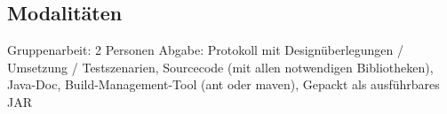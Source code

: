 \documentclass[letterpaper, 12pt]{article}
\let\tempsubsection\subsection
\renewcommand\subsection[1]{\vspace{0cm}\tempsubsection{#1}\vspace{0cm}}
\begin{document}
\subsection{Modalitäten}
Gruppenarbeit: 2 Personen
Abgabe: Protokoll mit Designüberlegungen / Umsetzung / Testszenarien, Sourcecode (mit allen notwendigen Bibliotheken), Java-Doc, Build-Management-Tool (ant oder maven), Gepackt als ausführbares JAR

\clearpage



\lstlistoflistings
\listoffigures
\end{document}
